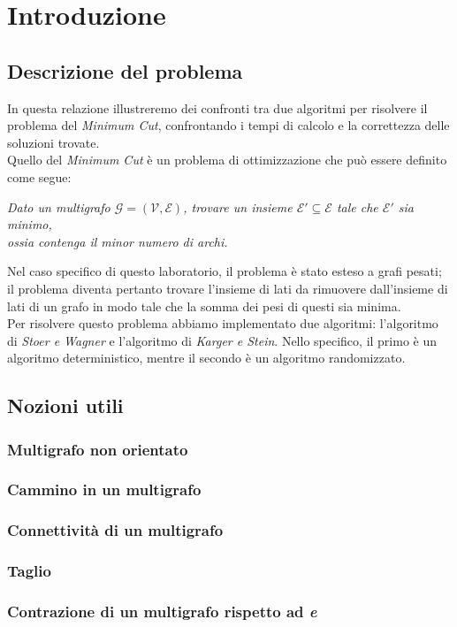\section{Introduzione}

\subsection{Descrizione del problema}
In questa relazione illustreremo dei confronti tra due algoritmi per risolvere il problema del \textit{Minimum Cut}, confrontando i tempi di calcolo e la correttezza delle soluzioni trovate. \\
Quello del \textit{Minimum Cut} è un problema di ottimizzazione che può essere definito come segue:
\begin{center}
    \centering
    \textit{
        Dato un multigrafo $\mathcal{G}=(\mathcal{V}, \mathcal{E})$, trovare un insieme $\mathcal{E}{}'\subseteq \mathcal{E}$ tale che $\mathcal{E}{}'$ sia minimo,\\ ossia contenga il minor numero di archi.
    }
\end{center}
Nel caso specifico di questo laboratorio, il problema è stato esteso a grafi pesati; il problema diventa pertanto trovare l'insieme di lati da rimuovere dall'insieme di lati di un grafo in modo tale che la somma dei pesi di questi sia minima. \\
Per risolvere questo problema abbiamo implementato due algoritmi: l'algoritmo di \textit{Stoer e Wagner} e l'algoritmo di \textit{Karger e Stein}. Nello specifico, il primo è un algoritmo deterministico, mentre il secondo è un algoritmo randomizzato.

\subsection{Nozioni utili}


\subsubsection*{Multigrafo non orientato}

\subsubsection*{Cammino in un multigrafo}

\subsubsection*{Connettività di un multigrafo}

\subsubsection*{Taglio}

\subsubsection*{Contrazione di un multigrafo rispetto ad \textit{e}}